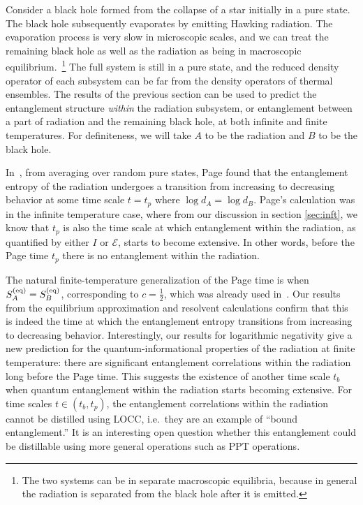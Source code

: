 \documentclass[a4paper,11pt]{article}
\newcommand\half{{\ensuremath{\frac{1}{2}}}}
\newcommand\ha{{\half}}
\newcommand\sE{{\ensuremath{{\mathcal E}}}}
\begin{document}
\begin{enumerate}
Consider a black hole formed from the collapse of a star initially in a pure state. The black hole subsequently evaporates by emitting Hawking radiation. 
The evaporation process is very slow in microscopic scales, and we can treat the remaining black hole as well as the radiation as being in macroscopic equilibrium.~\footnote{The two systems can be in separate macroscopic equilibria, because in general the radiation is separated from the black hole after it is emitted.} The full system is still in a pure state, and the reduced density operator of each subsystem can be far from the density operators of thermal ensembles. The results of the previous section can be used to predict 
the entanglement structure {\it within} the radiation subsystem, or entanglement between a part of radiation and the remaining black hole, at both infinite and finite temperatures. For definiteness, we will take $A$ to be the radiation and $B$ to be the black hole. 


 In~\cite{1993PhRvL..71.1291P}, from averaging over random pure states, Page found that the entanglement entropy of the radiation undergoes a transition from increasing to decreasing behavior at some time scale $t= t_p$ where $ \log d_A = \log d_B$. Page's calculation was in the infinite temperature case, where from our discussion in section \ref{sec:inft}, we know that $t_p$ is also the time scale at which entanglement within the radiation, as quantified by either $I$ or $\sE$, starts to become extensive. 
In other words, before the Page time $t_p$ there is no entanglement within the radiation. 


The natural finite-temperature generalization of the Page time is when $S_A^{(\rm eq)} = S_B^{(\rm eq)}$, corresponding to $c = \ha$, which was already used in~\cite{page2013time}. Our results from the equilibrium approximation and resolvent calculations confirm that this is indeed the time at which the entanglement entropy transitions from increasing to decreasing behavior. 
Interestingly, our results for logarithmic negativity give a new prediction for the quantum-informational properties of the radiation at finite temperature: there are significant entanglement correlations within the radiation long before the Page time. This suggests the 
existence of another time scale $t_b$ when quantum entanglement within the radiation starts becoming extensive. 
For time scales $t \in (t_b, t_p)$, the entanglement correlations within the radiation cannot be distilled using LOCC, i.e.~they are an example of 
``bound entanglement.'' It is an interesting open question whether this entanglement could be distillable using more general operations such as PPT operations. 



\end{enumerate}
\end{document}
